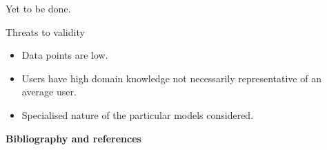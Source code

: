 \documentclass[a4paper,english]{article}
\newcounter{questenum}
\newcommand{\liststyleQuestion}{%
\renewcommand\theenumi{\roman{enumi}}
\renewcommand\theenumii{\alph{enumii}}
\renewcommand\theenumiii{\arabic{enumiii}}
\renewcommand\theenumiv{\arabic{enumiv}}
\renewcommand\labelenumi{\theenumi.}
\renewcommand\labelenumii{\theenumii.}
\renewcommand\labelenumiii{\theenumiii.}
\renewcommand\labelenumiv{\theenumiv.}
}
\newenvironment{questionenum}
{ \liststyleQuestion
  \enumerate
  \setcounter{enumi}{\value{questenum}}
  \bfseries
  \itshape }
{ \endenumerate
  \setcounter{questenum}{\value{enumi}} }
\begin{document}
Yet to be done.

\begin{questionenum}
\item Threats to validity
\end{questionenum}

\begin{itemize}
\item Data points are low. 
\item Users have high domain knowledge not necessarily representative of an average user. 
\item Specialised nature of the particular models considered. 
\end{itemize}

\clearpage

\textbf{Bibliography and references}
\end{document}
